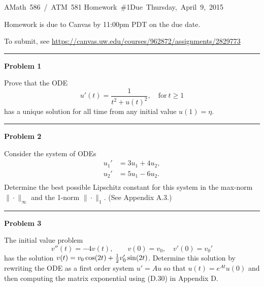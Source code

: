 \documentclass[10pt]{article}
\begin{document}
\hfill\vbox{\hbox{AMath 586 / ATM 581}
\hbox{Homework \#1}\hbox{Due Thursday, April 9, 2015}}

\vskip 5pt

Homework is due to Canvas by 11:00pm PDT on the due date.

To submit, see \url{https://canvas.uw.edu/courses/962872/assignments/2829773}


\vskip 1cm
\hrule
{\bf Problem 1}


Prove that the ODE 
\[
u'(t) = \frac 1 {t^2 + u(t)^2}, \quad \mbox{for}~t \geq 1
\]
has a unique solution for all time from any initial value $u(1)=\eta$.




\vskip 1cm
\hrule
{\bf Problem 2}

Consider the system of ODEs
\begin{equation*}
\begin{split}
u_1' &= 3u_1 + 4u_2,\\
u_2' &= 5u_1 - 6u_2.\\
\end{split}
\end{equation*}
Determine the best possible Lipschitz constant for this system in the max-norm
$\|\cdot\|_\infty$ and the 1-norm $\|\cdot\|_1$. (See Appendix A.3.)





\vskip 1cm
\hrule
{\bf Problem 3}


The initial value problem
\[
v''(t) = -4v(t), \qquad v(0) = v_0,\quad v'(0) = v_0'
\]
has the solution $v(t) = v_0\cos(2t) + \frac{1}{2} v_0' \sin(2t)$.  Determine this
solution by rewriting the ODE as a first order system $u' = Au$ so that
$u(t) = e^{At}u(0)$ and then computing the matrix exponential using (D.30)
in Appendix D.


\end{document}
